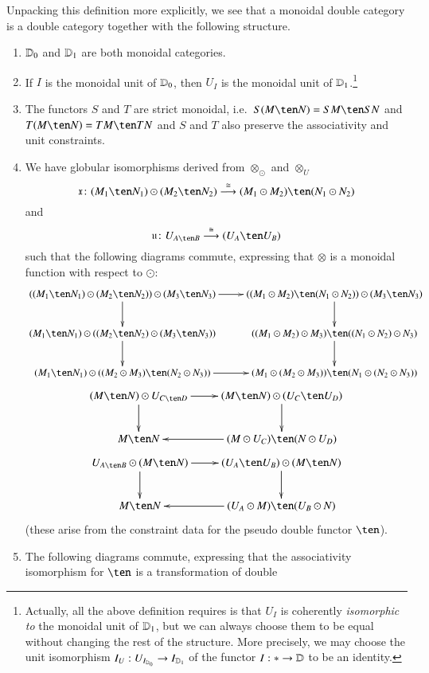 Unpacking this definition more explicitly, we see that a monoidal
double category is a double category together with the following
structure.
\begin{enumerate}
\item $\mathbb{D}_0$ and $\mathbb{D}_1$ are both monoidal categories.
\item If $I$ is the monoidal unit of $\mathbb{D}_0$, then $U_I$ is the
  monoidal unit of $\mathbb{D}_1$.\footnote{Actually, all the above
    definition requires is that $U_I$ is coherently \emph{isomorphic
      to} the monoidal unit of $\mathbb{D}_1$, but we can always choose them
    to be equal without changing the rest of the structure.
    More precisely, we may choose the unit isomorphism
    $I_U : U_{I_{\mathbb{D}_0}} \to I_{\mathbb{D}_1}$ of the functor $I:* \to \mathbb{D}$
    to be an identity.}
\item The functors $S$ and $T$ are strict monoidal, i.e.\ $S(M\ten N)
  = SM\ten SN$ and $T(M\ten N)=TM\ten TN$ and $S$ and $T$ also
  preserve the associativity and unit constraints.
\item \label{eq:mon1} We have globular isomorphisms derived from $\otimes_{\odot}$ and $\otimes_U$
  \[\fx\maps (M_1\ten N_1)\odot (M_2\ten N_2)\too[\iso] (M_1\odot M_2)\ten (N_1\odot N_2)\]
  and
  \[\fu\maps U_{A\ten B} \too[\iso] (U_A \ten U_B)\]
  such that the following diagrams commute, expressing that $\otimes$ is a monoidal function with respect to $\odot$:
\[
  \xymatrix{
    ((M_1\ten N_1)\odot (M_2\ten N_2)) \odot (M_3\ten N_3) \ar[r]\ar[d]
    & ((M_1\odot M_2)\ten (N_1\odot N_2)) \odot (M_3\ten N_3) \ar[d]\\
    (M_1\ten N_1)\odot ((M_2\ten N_2) \odot (M_3\ten N_3)) \ar[d] &
    ((M_1\odot M_2)\odot M_3) \ten ((N_1\odot N_2)\odot N_3) \ar[d]\\
    (M_1\ten N_1) \odot ((M_2\odot M_3) \ten (N_2\odot N_3))\ar[r] &
    (M_1\odot (M_2\odot M_3)) \ten (N_1\odot (N_2\odot N_3))}\]
  \[\xymatrix{(M\ten N) \odot U_{C\ten D} \ar[r]\ar[d] &
    (M\ten N)\odot (U_C\ten U_D) \ar[d]\\
    M\ten N\ar@{<-}[r] & (M\odot U_C) \ten (N\odot U_D)}\]
  \[\xymatrix{U_{A\ten B}\odot (M\ten N)  \ar[r]\ar[d] &
    (U_A\ten U_B)\odot (M\ten N) \ar[d]\\
    M\ten N\ar@{<-}[r] & (U_A \odot M) \ten (U_B\odot N)}\]
  (these arise from the constraint data for the pseudo double functor
  $\ten$).
\item \label{eq:mon2}The following diagrams commute, expressing that the
  associativity isomorphism for $\ten$ is a transformation of double

\end{enumerate}

